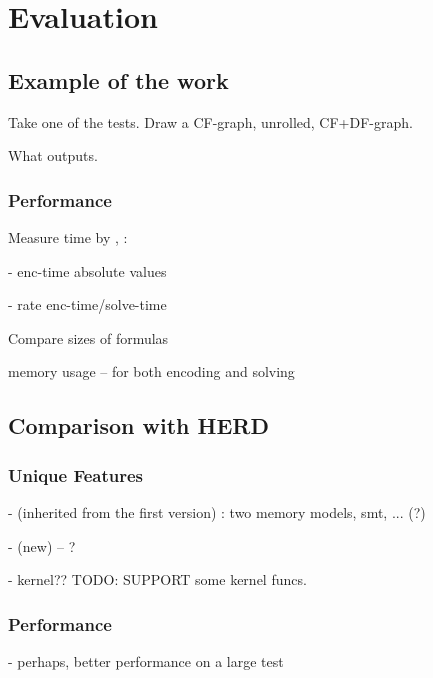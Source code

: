 \chapter{Evaluation}
\label{ch:eval}

\section{Example of the work}
Take one of the tests. Draw a CF-graph, unrolled, CF+DF-graph.

What outputs.


\subsection{Performance}

Measure time by \porthos[1], \porthos[2]:

- enc-time absolute values

- rate enc-time/solve-time


Compare sizes of formulas


memory usage -- for both encoding and solving




\section{Comparison with HERD}

\subsection{Unique Features}

- (inherited from the first version) : two memory models, smt, ... (?)

- (new) -- ?

- kernel?? TODO: SUPPORT some kernel funcs.


\subsection{Performance}

- perhaps, better performance on a large test